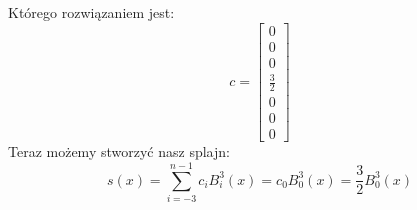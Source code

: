 \documentclass[a4paper]{article}
\begin{document}
      Którego rozwiązaniem jest:
      \[
         c =
         \begin{bmatrix}
            0 \\
            0 \\
            0 \\
            \frac{3}{2} \\
            0 \\
            0 \\
            0
         \end{bmatrix}
      \]
      Teraz możemy stworzyć nasz splajn:
      \[
         s(x) =
         \sum_{i=-3}^{n-1} c_{i} B_{i}^{3}(x) =
         c_{0} B_{0}^{3}(x) =
         \frac{3}{2} B_{0}^{3}(x)
      \]
\end{document}
